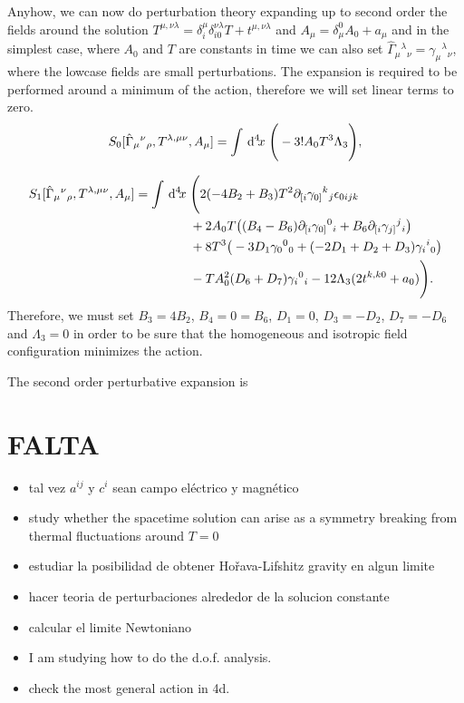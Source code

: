 \documentclass[%
  showpacs,showkeys,prd,superscriptaddress]{revtex4-1}
\begin{document}
Anyhow, we can now do perturbation theory expanding up to second order the fields around the solution $T^{\mu,\nu\lambda} = \delta^{\mu}_i \delta_{i0}^{\nu\lambda}T + t^{\mu,\nu\lambda}$ and $A_\mu=\delta_\mu^0A_0+a_\mu$ and in the simplest case, where $A_0$ and $T$ are constants in time we can also set $\hat\Gamma_\mu{}^\lambda{}_\nu=\gamma_\mu{}^\lambda{}_\nu$, where the lowcase fields are small perturbations. The expansion is required to be performed around a minimum of the action, therefore we will set linear terms to zero. 
\begin{align}
  \label{3+1fullPerturbed}
   S_0[\hat\Gamma_{\mu}{}^{\nu}{}_\rho,T^{\lambda,\mu\nu},A_\mu]=\int\,{\mathrm{d}}^{4}\!{x}\;\Bigg(-3!A_0T^3\Lambda_3\Bigg),
\end{align}

\begin{equation}
  \begin{split}
    \label{3+1full1stOrder}
    S_1[\hat\Gamma_{\mu}{}^{\nu}{}_\rho,T^{\lambda,\mu\nu},A_\mu] = \int\,{\mathrm{d}}^{4}\!{x}\; &\Bigg(2(-4B_2+B_3)T^2\partial_{[i}\gamma_{0]}{}^k{}_j\epsilon_{0ijk} \\
    & + 2 A_0 T \big((B_4-B_6)\partial_{[i}\gamma_{0]}{}^0{}_i+B_6\partial_{[i}\gamma_{j]}{}^j{}_i\big)\\
    & + 8 T^3 \big(-3D_1\gamma_0{}^0{}_0+(-2D_1+D_2+D_3)\gamma_i{}^i{}_0\big)\\
    & - T A_0^2(D_6+D_7)\gamma_i{}^0{}_i -12\Lambda_3( 2t^{k,k0}+a_0)\Bigg).
  \end{split}
\end{equation}
Therefore, we must set $B_3=4B_2$, $B_4=0=B_6$, $D_1=0$, $D_3=-D_2$,  $D_7=-D_6$ and $\Lambda_3=0$ in order to be sure that the homogeneous and isotropic field configuration minimizes the action. 

The second order perturbative expansion  is

\section*{FALTA}

\begin{itemize}
\item tal vez $a^{ij}$ y $c^i$ sean campo el\'ectrico y magn\'etico

\item study  whether the spacetime solution can arise as a symmetry breaking from thermal fluctuations around $T=0$

\item estudiar la posibilidad de obtener Ho\v{r}ava-Lifshitz gravity en algun limite

\item hacer teoria de perturbaciones alrededor de la solucion constante

\item calcular el limite Newtoniano

\item I am studying how to do the d.o.f. analysis.
\item check the most general action in 4d.
\end{itemize}

\nocite{Tucker:1996sx,Horava:2009uw,Lu:2009em,Gibbs:1995gj,WheelerPre}



\end{document}
